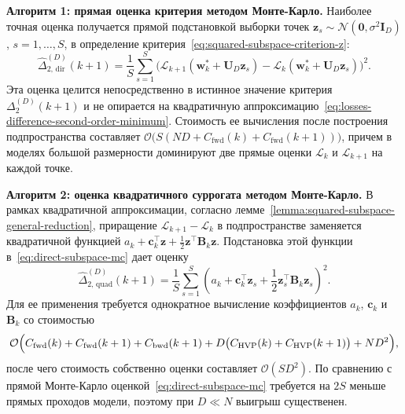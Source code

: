 \textbf{Алгоритм 1: прямая оценка критерия методом Монте-Карло.} Наиболее точная оценка получается прямой подстановкой выборки точек $\mathbf z_s \sim \mathcal N(\mathbf 0, \sigma^2 \mathbf I_D)$, $s = 1, \ldots, S$, в определение критерия~\eqref{eq:squared-subspace-criterion-z}:
\begin{equation}
    \label{eq:direct-subspace-mc}
    \widehat \Delta_{2,\,\mathrm{dir}}^{(D)}(k+1)
    =
    \frac{1}{S}\sum_{s=1}^{S}
    \big(
        \mathcal L_{k+1}(\mathbf w_k^* + \mathbf U_D \mathbf z_s)
        -
        \mathcal L_k(\mathbf w_k^* + \mathbf U_D \mathbf z_s)
    \big)^2.
\end{equation}
Эта оценка целится непосредственно в истинное значение критерия $\Delta_2^{(D)}(k+1)$ и не опирается на квадратичную аппроксимацию~\eqref{eq:losses-difference-second-order-minimum}. Стоимость ее вычисления после построения подпространства составляет $\mathcal O\bigl(S(ND + C_{\mathrm{fwd}}(k)+C_{\mathrm{fwd}}(k+1))\bigr)$, причем в моделях большой размерности доминируют две прямые оценки $\mathcal L_k$ и $\mathcal L_{k+1}$ на каждой точке.

\textbf{Алгоритм 2: оценка квадратичного суррогата методом Монте-Карло.} В рамках квадратичной аппроксимации, согласно лемме~\ref{lemma:squared-subspace-general-reduction}, приращение $\mathcal L_{k+1}-\mathcal L_k$ в подпространстве заменяется квадратичной функцией $a_k+\mathbf c_k^\top \mathbf z + \tfrac12 \mathbf z^\top \mathbf B_k \mathbf z$. Подстановка этой функции в~\eqref{eq:direct-subspace-mc} дает оценку
\begin{equation}
    \label{eq:quad-subspace-mc}
    \widehat \Delta_{2,\,\mathrm{quad}}^{(D)}(k+1)
    =
    \frac{1}{S}\sum_{s=1}^{S}
    \left(
        a_k + \mathbf c_k^\top \mathbf z_s + \frac12 \mathbf z_s^\top \mathbf B_k \mathbf z_s
    \right)^2.
\end{equation}
Для ее применения требуется однократное вычисление коэффициентов $a_k$, $\mathbf c_k$ и $\mathbf B_k$ со стоимостью
\begin{equation}
    \label{eq:proxy-setup-cost}
    \mathcal O\Bigl(
        C_{\mathrm{fwd}}(k)+C_{\mathrm{fwd}}(k+1)
        + C_{\mathrm{bwd}}(k+1)
        + D\bigl(C_{\mathrm{HVP}}(k)+C_{\mathrm{HVP}}(k+1)\bigr)
        + ND^2
    \Bigr),
\end{equation}
после чего стоимость собственно оценки составляет $\mathcal O(SD^2)$. По сравнению с прямой Монте-Карло оценкой~\eqref{eq:direct-subspace-mc} требуется на $2S$ меньше прямых проходов модели, поэтому при $D\ll N$ выигрыш существенен.

